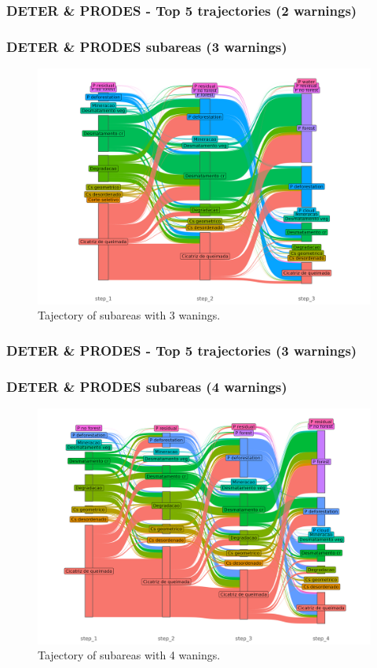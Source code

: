 \documentclass[aspectratio=169]{beamer}
\begin{document}
\begin{frame}[allowframebreaks]
    \frametitle{DETER \& PRODES - Top 5 trajectories (2 warnings)}
    
\end{frame}

\begin{frame}
    \frametitle{DETER \& PRODES subareas (3 warnings)}
    \begin{figure}[h] 
        \includegraphics[width=0.65\linewidth]
        {./figures/plot_deter_prodes_subarea_trajectory_3.png}
        \caption{Tajectory of subareas with 3 wanings.}
        \label{fig:deter_prodes_subarea_trajectory_3}
    \end{figure}
\end{frame}

\begin{frame}[allowframebreaks]
    \frametitle{DETER \& PRODES - Top 5 trajectories (3 warnings)}
    
\end{frame}

\begin{frame}
    \frametitle{DETER \& PRODES subareas (4 warnings)}
    \begin{figure}[h] 
        \includegraphics[width=0.65\linewidth]
        {./figures/plot_deter_prodes_subarea_trajectory_4.png}
        \caption{Tajectory of subareas with 4 wanings.}
        \label{fig:deter_prodes_subarea_trajectory_4}
    \end{figure}
\end{frame}
\end{document}
